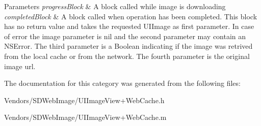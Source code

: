 \begin{DoxyParams}{Parameters}
{\em progress\+Block} & A block called while image is downloading \\
\hline
{\em completed\+Block} & A block called when operation has been completed. This block has no return value and takes the requested U\+I\+Image as first parameter. In case of error the image parameter is nil and the second parameter may contain an N\+S\+Error. The third parameter is a Boolean indicating if the image was retrived from the local cache or from the network. The fourth parameter is the original image url. \\
\hline
\end{DoxyParams}


The documentation for this category was generated from the following files\+:\begin{DoxyCompactItemize}
\item 
Vendors/\+S\+D\+Web\+Image/U\+I\+Image\+View+\+Web\+Cache.\+h\item 
Vendors/\+S\+D\+Web\+Image/U\+I\+Image\+View+\+Web\+Cache.\+m\end{DoxyCompactItemize}
